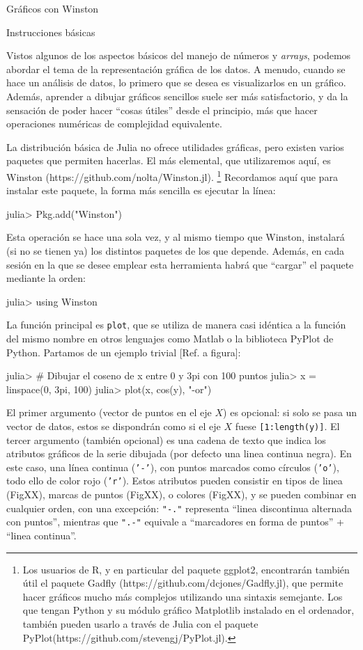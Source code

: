 ﻿\documentclass{article}
\newcommand{\jl}{\texttt}
\begin{document}
Gráficos con Winston

Instrucciones básicas

Vistos algunos de los aspectos básicos del manejo de números y \emph{arrays}, podemos abordar el tema de la representación gráfica de los datos. A menudo, cuando se hace un análisis de datos, lo primero que se desea es visualizarlos en un gráfico. Además, aprender a dibujar gráficos sencillos suele ser más satisfactorio, y da la sensación de poder hacer ``cosas útiles'' desde el principio, más que hacer operaciones numéricas de complejidad equivalente.

La distribución básica de Julia no ofrece utilidades gráficas, pero existen varios paquetes que permiten hacerlas. El más elemental, que utilizaremos aquí, es Winston (https://github.com/nolta/Winston.jl).%
\footnote{%
Los usuarios de R, y en particular del paquete ggplot2, encontrarán también útil el paquete Gadfly (https://github.com/dcjones/Gadfly.jl), que permite hacer gráficos mucho más complejos utilizando una sintaxis semejante. Los que tengan Python y su módulo gráfico Matplotlib instalado en el ordenador, también pueden usarlo a través de Julia con el paquete PyPlot(https://github.com/stevengj/PyPlot.jl).}%
Recordamos aquí que para instalar este paquete, la forma más sencilla es ejecutar la línea:

julia> Pkg.add("Winston")

Esta operación se hace una sola vez, y al mismo tiempo que Winston, instalará (si no se tienen ya) los distintos paquetes de los que depende. Además, en cada sesión en la que se desee emplear esta herramienta habrá que ``cargar'' el paquete mediante la orden:

julia> using Winston

La función principal es \jl{plot}, que se utiliza de manera casi idéntica a la función del mismo nombre en otros lenguajes como Matlab o la biblioteca PyPlot de Python. Partamos de un ejemplo trivial [Ref. a figura]:

julia> # Dibujar el coseno de x entre 0 y 3pi con 100 puntos
julia> x = linspace(0, 3pi, 100)
julia> plot(x, cos(y), "-or")

El primer argumento (vector de puntos en el eje $X$) es opcional: si solo se pasa un vector de datos, estos se dispondrán como si el eje $X$ fuese \jl{[1:length(y)]}. El tercer argumento (también opcional) es una cadena de texto que indica los atributos gráficos de la serie dibujada (por defecto una linea continua negra). En este caso, una línea continua (\jl{'-'}), con puntos marcados como círculos (\jl{'o'}), todo ello de color rojo (\jl{'r'}). Estos atributos pueden consistir en tipos de linea (FigXX), marcas de puntos (FigXX), o colores (FigXX), y se pueden combinar en cualquier orden, con una excepción: \jl{"-."} representa ``linea discontinua alternada con puntos'', mientras que \jl{".-"} equivale a ``marcadores en forma de puntos'' + ``linea continua''.
\end{document}
